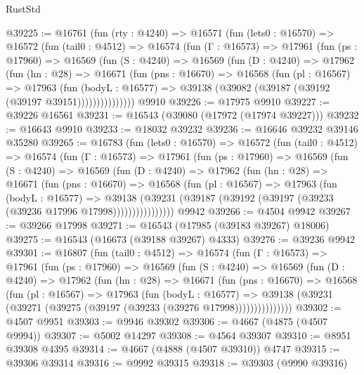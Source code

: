 \begin{lexlean}{RustStd}
\begin{coremodule}
@39225 := @16761
    (fun (rty : @4240) =>
    @16571
      (fun (lets0 : @16570) =>
      @16572
        (fun (tail0 : @4512) =>
        @16574
          (fun (Γ : @16573) =>
          @17961
            (fun (ps : @17960) =>
            @16569
              (fun (S : @4240) =>
              @16569
                (fun (D : @4240) =>
                @17962
                  (fun (hn : @28) =>
                  @16671
                    (fun (pns : @16670) =>
                    @16568
                      (fun (pl : @16567) =>
                      @17963
                        (fun (bodyL : @16577) =>
                        @39138 (@39082 (@39187 (@39192 (@39197 @39151)))))))))))))))
    @9910
@39226 := @17975 @9910
@39227 := @39226 @16561
@39231 := @16543 (@39080 (@17972 (@17974 @39227)))
@39232 := @16643 @9910
@39233 := @18032 @39232
@39236 := @16646 @39232 @39146 @35280
@39265 := @16783
    (fun (lets0 : @16570) =>
    @16572
      (fun (tail0 : @4512) =>
      @16574
        (fun (Γ : @16573) =>
        @17961
          (fun (ps : @17960) =>
          @16569
            (fun (S : @4240) =>
            @16569
              (fun (D : @4240) =>
              @17962
                (fun (hn : @28) =>
                @16671
                  (fun (pns : @16670) =>
                  @16568
                    (fun (pl : @16567) =>
                    @17963
                      (fun (bodyL : @16577) =>
                      @39138
                        (@39231
                          (@39187 (@39192 (@39197 (@39233 (@39236 @17996 @17998))))))))))))))))
    @9942
@39266 := @4504 @9942
@39267 := @39266 @17998
@39271 := @16543 (@17985 (@39183 @39267) @18006)
@39275 := @16543 (@16673 (@39188 @39267) @4333)
@39276 := @39236 @9942
@39301 := @16807
    (fun (tail0 : @4512) =>
    @16574
      (fun (Γ : @16573) =>
      @17961
        (fun (ps : @17960) =>
        @16569
          (fun (S : @4240) =>
          @16569
            (fun (D : @4240) =>
            @17962
              (fun (hn : @28) =>
              @16671
                (fun (pns : @16670) =>
                @16568
                  (fun (pl : @16567) =>
                  @17963
                    (fun (bodyL : @16577) =>
                    @39138 (@39231 (@39271 (@39275 (@39197 (@39233 (@39276 @17998)))))))))))))))
@39302 := @4507 @9951
@39303 := @9946 @39302
@39306 := @4667 (@4875 (@4507 @9994))
@39307 := @5002 @14297
@39308 := @4564 @39307
@39310 := @8951 @39308 @4395
@39314 := @4667 (@4888 (@4507 @39310)) @4747
@39315 := @39306 @39314
@39316 := @9992 @39315
@39318 := @39303 (@9990 @39316)

\end{coremodule}
\end{lexlean}
